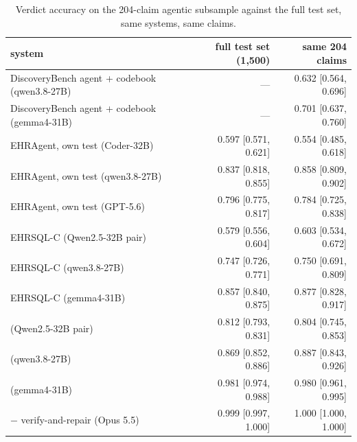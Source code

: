 \begin{table}[htbp]
\centering
\scriptsize
\setlength{\tabcolsep}{3pt}
\begin{tabular}{@{}lrr@{}}
\toprule
system & full test set (1{,}500) & same 204 claims \\
\midrule
DiscoveryBench agent + codebook (qwen3.8-27B) & --- & 0.632 [0.564, 0.696] \\
DiscoveryBench agent + codebook (gemma4-31B) & --- & 0.701 [0.637, 0.760] \\
EHRAgent, own test (Coder-32B) & 0.597 [0.571, 0.621] & 0.554 [0.485, 0.618] \\
EHRAgent, own test (qwen3.8-27B) & 0.837 [0.818, 0.855] & 0.858 [0.809, 0.902] \\
EHRAgent, own test (GPT-5.6) & 0.796 [0.775, 0.817] & 0.784 [0.725, 0.838] \\
EHRSQL-C (Qwen2.5-32B pair) & 0.579 [0.556, 0.604] & 0.603 [0.534, 0.672] \\
EHRSQL-C (qwen3.8-27B) & 0.747 [0.726, 0.771] & 0.750 [0.691, 0.809] \\
EHRSQL-C (gemma4-31B) & 0.857 [0.840, 0.875] & 0.877 [0.828, 0.917] \\
\art{} (Qwen2.5-32B pair) & 0.812 [0.793, 0.831] & 0.804 [0.745, 0.853] \\
\art{} (qwen3.8-27B) & 0.869 [0.852, 0.886] & 0.887 [0.843, 0.926] \\
\art{} (gemma4-31B) & 0.981 [0.974, 0.988] & 0.980 [0.961, 0.995] \\
\art{} $-$ verify-and-repair (Opus 5.5) & 0.999 [0.997, 1.000] & 1.000 [1.000, 1.000] \\
\bottomrule
\end{tabular}
\caption{Verdict accuracy on the 204-claim agentic subsample against the full
test set, same systems, same claims.}
\label{tab:subsample}
\end{table}

